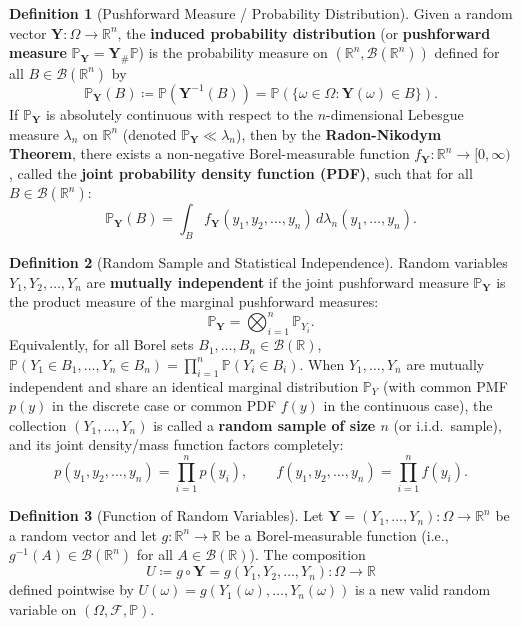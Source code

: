 \documentclass[11pt, letterpaper]{article}
\theoremstyle{definition}
\newtheorem{definition}{Definition}[section]
\theoremstyle{remark}
\newcommand{\R}{\mathbb{R}}
\newcommand{\Prob}{\mathbb{P}}
\newcommand{\F}{\mathcal{F}}
\begin{document}
\begin{definition}[Pushforward Measure / Probability Distribution]
Given a random vector $\mathbf{Y}: \Omega \to \R^n$, the \textbf{induced probability distribution} (or \textbf{pushforward measure} $\Prob_{\mathbf{Y}} = \mathbf{Y}_\# \Prob$) is the probability measure on $(\R^n, \mathcal{B}(\R^n))$ defined for all $B \in \mathcal{B}(\R^n)$ by
\[
    \Prob_{\mathbf{Y}}(B) \coloneqq \Prob(\mathbf{Y}^{-1}(B)) = \Prob(\{\omega \in \Omega : \mathbf{Y}(\omega) \in B\}).
\]
If $\Prob_{\mathbf{Y}}$ is absolutely continuous with respect to the $n$-dimensional Lebesgue measure $\lambda_n$ on $\R^n$ (denoted $\Prob_{\mathbf{Y}} \ll \lambda_n$), then by the \textbf{Radon-Nikodym Theorem}, there exists a non-negative Borel-measurable function $f_{\mathbf{Y}}: \R^n \to [0, \infty)$, called the \textbf{joint probability density function (PDF)}, such that for all $B \in \mathcal{B}(\R^n)$:
\[
    \Prob_{\mathbf{Y}}(B) = \int_B f_{\mathbf{Y}}(y_1, y_2, \dots, y_n) \, d\lambda_n(y_1, \dots, y_n).
\]
\end{definition}

\begin{definition}[Random Sample and Statistical Independence]
Random variables $Y_1, Y_2, \dots, Y_n$ are \textbf{mutually independent} if the joint pushforward measure $\Prob_{\mathbf{Y}}$ is the product measure of the marginal pushforward measures:
\[
    \Prob_{\mathbf{Y}} = \bigotimes_{i=1}^n \Prob_{Y_i}.
\]
Equivalently, for all Borel sets $B_1, \dots, B_n \in \mathcal{B}(\R)$, $\Prob(Y_1 \in B_1, \dots, Y_n \in B_n) = \prod_{i=1}^n \Prob(Y_i \in B_i)$. When $Y_1, \dots, Y_n$ are mutually independent and share an identical marginal distribution $\Prob_Y$ (with common PMF $p(y)$ in the discrete case or common PDF $f(y)$ in the continuous case), the collection $(Y_1, \dots, Y_n)$ is called a \textbf{random sample of size $n$} (or i.i.d.\ sample), and its joint density/mass function factors completely:
\[
    p(y_1, y_2, \dots, y_n) = \prod_{i=1}^n p(y_i), \qquad f(y_1, y_2, \dots, y_n) = \prod_{i=1}^n f(y_i).
\]
\end{definition}

\begin{definition}[Function of Random Variables]
Let $\mathbf{Y} = (Y_1, \dots, Y_n): \Omega \to \R^n$ be a random vector and let $g: \R^n \to \R$ be a Borel-measurable function (i.e., $g^{-1}(A) \in \mathcal{B}(\R^n)$ for all $A \in \mathcal{B}(\R)$). The composition
\[
    U \coloneqq g \circ \mathbf{Y} = g(Y_1, Y_2, \dots, Y_n): \Omega \to \R
\]
defined pointwise by $U(\omega) = g(Y_1(\omega), \dots, Y_n(\omega))$ is a new valid random variable on $(\Omega, \F, \Prob)$.
\end{definition}
\end{document}
